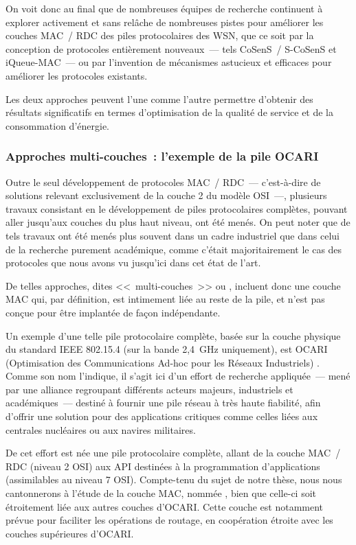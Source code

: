 \bigskip

On voit donc au final que de nombreuses équipes de recherche continuent
à explorer activement et sans relâche de nombreuses pistes pour
améliorer les couches MAC~/ RDC des piles protocolaires des WSN,
que ce soit par la conception de protocoles entièrement nouveaux~---
tels CoSenS~/ S-CoSenS et iQueue-MAC~--- ou par l'invention de mécanismes
astucieux et efficaces pour améliorer les protocoles existants.

Les deux approches peuvent l'une comme l'autre permettre d'obtenir
des résultats significatifs en termes d'optimisation de la qualité
de service et de la consommation d'énergie. 

\subsubsection{Approches multi-couches~: l'exemple de la pile OCARI}
\label{ParOCARI}

Outre le seul développement de protocoles MAC~/ RDC~--- c'est-à-dire
de solutions relevant exclusivement de la couche 2 du modèle OSI~---,
plusieurs travaux consistant en le développement de piles protocolaires
complètes, pouvant aller jusqu'aux couches du plus haut niveau, ont été
menés. On peut noter que de tels travaux ont été menés plus souvent dans
un cadre industriel que dans celui de la recherche purement académique,
comme c'était majoritairement le cas des protocoles que nous avons vu
jusqu'ici dans cet état de l'art.

De telles approches, dites <<~multi-couches~>> ou ,
incluent donc une couche MAC qui, par définition, est intimement liée
au reste de la pile, et n'est  pas conçue pour être
implantée de façon indépendante.

Un exemple d'une telle pile protocolaire complète, basée sur la couche
physique du standard IEEE 802.15.4 (sur la bande 2,4~GHz uniquement),
est OCARI (Optimisation des Communications Ad-hoc pour les Réseaux
Industriels) \cite{OCARI}. Comme son nom l'indique, il s'agit ici d'un
effort de recherche appliquée~--- mené par une alliance regroupant
différents acteurs majeurs, industriels et académiques~--- destiné à
fournir une pile réseau à très haute fiabilité, afin d'offrir une
solution pour des applications critiques comme celles liées aux
centrales nucléaires ou aux navires militaires.

De cet effort est née une pile protocolaire complète, allant de la couche
MAC~/ RDC (niveau 2 OSI) aux API destinées à la programmation d'applications
(assimilables au niveau 7 OSI). Compte-tenu du sujet de notre thèse, nous
nous cantonnerons à l'étude de la couche MAC, nommée , bien que
celle-ci soit étroitement liée aux autres couches d'OCARI. Cette couche
est notamment prévue pour faciliter les opérations de routage, en
coopération étroite avec les couches supérieures d'OCARI.

